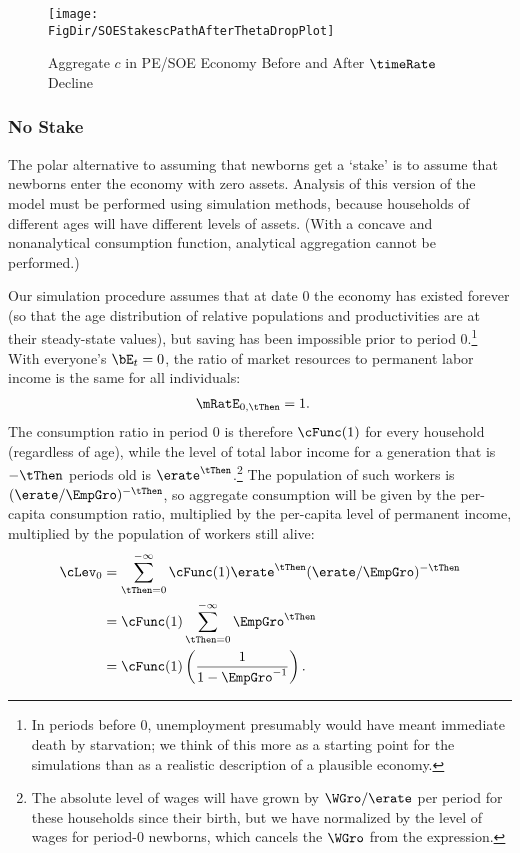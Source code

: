 \documentclass{\handout}
\begin{document}
\begin{figure}
\caption{Aggregate $c$ in PE/SOE Economy Before and After $\timeRate$ Decline}
\texttt{[image: \\FigDir/SOEStakescPathAfterThetaDropPlot]}
\label{fig:SOEStakescPathAfterThetaDropPlot}
\end{figure}

\subsubsection{No Stake}

The polar alternative to assuming that newborns get a `stake' is to
assume that newborns enter the economy with zero assets.  Analysis of
this version of the model must be performed using simulation methods,
because households of different ages will have different levels of
assets.  (With a concave and nonanalytical consumption function,
analytical aggregation cannot be performed.)

Our simulation procedure assumes that at date 0 the economy has existed forever (so 
that the age distribution of relative populations and productivities are at their steady-state values), but saving has been impossible prior to
period 0.\footnote{In periods before 0, unemployment presumably would have 
meant immediate death by starvation; we think of this more as a starting point
for the simulations than as a realistic description of a plausible economy.}
With everyone's $\bE_{t}=0$, the ratio of market resources to permanent
labor income is the same for all individuals:
\begin{equation}\begin{gathered}\begin{aligned}
  \mRatE_{0,\tThen} & =  1
.
\end{aligned}\end{gathered}\end{equation}
The consumption ratio in period 0 is therefore $\cFunc(1)$ for every
household (regardless of age), while the
level of total labor income for a generation that is $-\tThen$ periods old is $\erate^{\tThen}$.\footnote{The absolute level of wages will have
grown by $\WGro/\erate$ per period for these households since their birth, but we have normalized by the level of wages
for period-0 newborns, which cancels the $\WGro$ from the expression.}  The population of
such workers is $(\erate/\EmpGro)^{-\tThen}$, so aggregate consumption will
be given by the per-capita consumption ratio, multiplied by the
per-capita level of permanent income, multiplied by the population of
workers still alive:
\begin{equation}\begin{gathered}\begin{aligned}
  \cLev_{0} & =  \sum_{\tThen=0}^{-\infty} \cFunc(1) \erate^{\tThen} (\erate/\EmpGro)^{-\tThen}
\\ & =  \cFunc(1) \sum_{\tThen=0}^{-\infty}  \EmpGro^{\tThen}
\\ & =  \cFunc(1) \left(\frac{1}{1-\EmpGro^{-1}}\right)
.
\end{aligned}\end{gathered}\end{equation}
\end{document}
